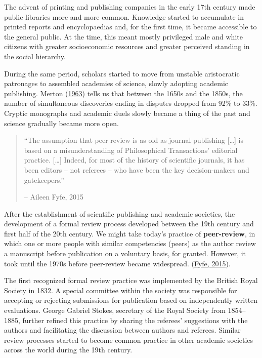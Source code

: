 \documentclass[
]{book}
\begin{document}
The advent of printing and publishing companies in the early 17th century made public libraries more and more common. Knowledge started to accumulate in printed reports and encyclopaedias and, for the first time, it became accessible to the general public. At the time, this meant mostly privileged male and white citizens with greater socioeconomic resources and greater perceived standing in the social hierarchy.

During the same period, scholars started to move from unstable aristocratic patronages to assembled academies of science, slowly adopting academic publishing. Merton (\href{https://www.cambridge.org/core/journals/european-journal-of-sociology-archives-europeennes-de-sociologie/article/abs/resistance-to-the-systematic-study-of-multiple-discoveries-in-science/8FEC108B3D8B0DAD60416B36BE342959}{1963}) tells us that between the 1650s and the 1850s, the number of simultaneous discoveries ending in disputes dropped from 92\% to 33\%. Cryptic monographs and academic duels slowly became a thing of the past and science gradually became more open.

\begin{quote}
``The assumption that peer review is as old as journal publishing {[}\ldots{]} is based on a misunderstanding of Philosophical Transactions' editorial practice. {[}\ldots{]} Indeed, for most of the history of scientific journals, it has been editors -- not referees -- who have been the key decision-makers and gatekeepers.''

-- Aileen Fyfe, 2015
\end{quote}

After the establishment of scientific publishing and academic societies, the development of a formal review process developed between the 19th century and first half of the 20th century. We might take today's practice of \textbf{peer-review}, in which one or more people with similar competencies (peers) as the author review a manuscript before publication on a voluntary basis, for granted. However, it took until the 1970s before peer-review became widespread. (\href{https://web.archive.org/web/20220316123936/https:/www.timeshighereducation.com/features/peer-review-not-old-you-might-think}{Fyfe, 2015}).

The first recognized formal review practice was implemented by the British Royal Society in 1832. A special committee within the society was responsible for accepting or rejecting submissions for publication based on independently written evaluations. George Gabriel Stokes, secretary of the Royal Society from 1854--1885, further refined this practice by sharing the referees' suggestions with the authors and facilitating the discussion between authors and referees. Similar review processes started to become common practice in other academic societies across the world during the 19th century.
\end{document}
